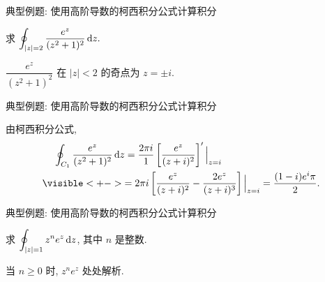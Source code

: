 \begin{frame}{典型例题: 使用高阶导数的柯西积分公式计算积分}
\onslide<+->
\begin{example}
求 $\displaystyle\oint_{|z|=2}\frac{e^z}{(z^2+1)^2}\,\mathrm{d} z.$
\end{example}
\onslide<+->
\begin{solution}
$\dfrac{e^z}{(z^2+1)^2}$ 在 $|z|<2$ 的奇点为 $z=\pm i$.
\end{solution}
\end{frame}


\begin{frame}{典型例题: 使用高阶导数的柯西积分公式计算积分}
\onslide<+->
\begin{solutionc}
由柯西积分公式,
\begin{align*}
&\peq\oint_{C_1}\frac{e^z}{(z^2+1)^2}\diff z
=\frac{2\pi i}{1}\left[\frac{e^z}{(z+i)^2}\right]'\Big|_{z=i}\\
&\visible<+->{=2\pi i\left[\frac{e^z}{(z+i)^2}-\frac{2e^z}{(z+i)^3}\right]\Big|_{z=i}
=\frac{(1-i)e^i\pi}2.}
\end{align*}

\vspace{-\baselineskip}
\end{solutionc}
\end{frame}


\begin{frame}{典型例题: 使用高阶导数的柯西积分公式计算积分}
\onslide<+->
\begin{example}
求 $\displaystyle\oint_{|z|=1}z^ne^z\,\mathrm{d} z$, 其中 $n$ 是整数.
\end{example}
\onslide<+->
\begin{solution}
当 $n\ge 0$ 时, $z^ne^z$ 处处解析.

\end{solution}
\end{frame}


